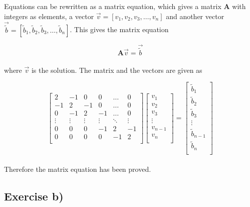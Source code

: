 \documentclass{article}
\begin{document}
  Equations can be rewritten as a matrix equation, which gives a matrix \textbf{A} with integers as elements, a vector $\vec{v} = [v_1, v_2, v_3, \hdots , v_n]$ and another vector $\vec{\tilde{b}} = [\tilde{b}_1, \tilde{b}_2, \tilde{b}_3, \hdots , \tilde{b}_n]$. This gives the matrix equation

  \begin{equation}
    \textbf{A} \vec{v} = \vec{\tilde{b}}  \label{eq:matrixeq}
  \end{equation} \\

  where $\vec{v}$ is the solution. The matrix and the vectors are given as

  \begin{equation} \label{eq:fullmatrixeq}
    \begin{bmatrix}
      2 & -1 & 0 & 0 & \dots & 0 \\
      -1 & 2 & -1 & 0 & \dots & 0 \\
      0 & -1 & 2 & -1 & \dots & 0 \\
      \vdots & \vdots & \vdots & \vdots & \ddots & \vdots \\
      0 & 0 & 0 & -1 & 2 & -1 \\
      0 & 0 & 0 & 0 & -1 & 2 \\
    \end{bmatrix}
    \begin{bmatrix}
      v_1 \\
      v_2 \\
      v_3 \\
      \vdots \\
      v_{n-1} \\
      v_n \\
    \end{bmatrix}
    =
    \begin{bmatrix}
      \tilde{b}_1 \\
      \tilde{b}_2 \\
      \tilde{b}_3 \\
      \vdots \\
      \tilde{b}_{n-1} \\
      \tilde{b}_n \\
    \end{bmatrix}
  \end{equation} \\

  Therefore the matrix equation has been proved. \\

\subsection{Exercise b)} \label{sec:Method b)}
\end{document}
